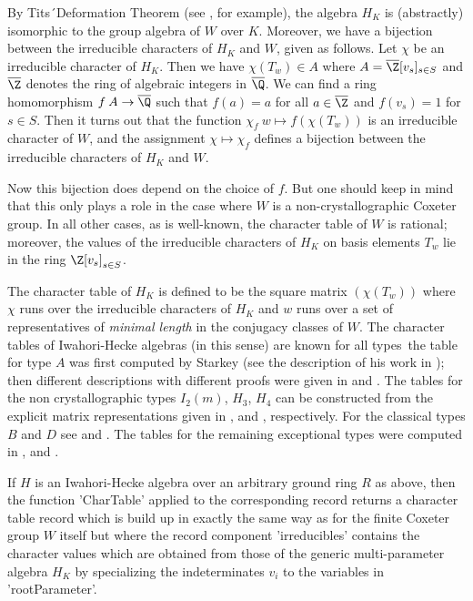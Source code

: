 By Tits\'\ Deformation Theorem (see \cite[Sec.~68]{CR87}, for example), the
algebra  $H_K$ is (abstractly) isomorphic to  the group algebra of $W$ over
$K$.  Moreover, we have  a bijection between  the irreducible characters of
$H_K$  and $W$, given as follows. Let $\chi$ be an irreducible character of
$H_K$. Then we have $\chi(T_w) \in A$ where $A=\overline{\Z}[v_s]_{s\in S}$
and   $\overline{\Z}$   denotes   the   ring   of   algebraic  integers  in
$\overline{\Q}$.  We  can  find  a  ring  homomorphism  $f\:  A \rightarrow
\overline{\Q}$  such  that  $f(a)=a$  for  all  $a  \in  \overline{\Z}$ and
$f(v_s)=1$  for $s\in S$. Then it turns  out that the function $\chi_f \: w
\mapsto   f(\chi(T_w))$  is  an  irreducible  character  of  $W$,  and  the
assignment   $\chi  \mapsto   \chi_f$  defines   a  bijection  between  the
irreducible characters of $H_K$ and $W$.

Now this bijection does depend on the choice of $f$. But one should keep in
mind that this only plays a role in the case where $W$ is a
non-crystallographic  Coxeter group. In all  other cases, as is well-known,
the  character  table  of  $W$  is  rational;  moreover,  the values of the
irreducible  characters of  $H_K$ on  basis elements  $T_w$ lie in the ring
$\Z[v_s]_{s\in S}$.

The  character  table of $H_K$   is   defined to  be  the square   matrix
$(\chi(T_w))$ where $\chi$ runs  over the irreducible characters of $H_K$
and $w$ runs over a set of representatives of {\em minimal length} in the
conjugacy classes of $W$.  The character tables of Iwahori-Hecke algebras
(in this sense) are known  for all types\:\  the  table for type $A$  was
first  computed   by Starkey (see    the   description of   his work   in
\cite{Car86});  then different   descriptions with  different proofs were
given  in  \cite{Ram91} and   \cite{Pfe94b}.    The tables for  the   non
crystallographic types $I_2(m)$, $H_3$, $H_4$ can be constructed from the
explicit   matrix    representations    given   in \cite[Sec.~67C]{CR87},
\cite{Lus81} and \cite{AL82}, respectively.  For  the classical types $B$
and  $D$ see \cite{HR94} and  \cite{Pfe96}.  The tables for the remaining
exceptional  types   were  computed  in  \cite{Gec94},  \cite{Gec95}  and
\cite{GM97}.

If $H$  is an Iwahori-Hecke algebra over  an arbitrary ground ring $R$ as
above, then the {\GAP}  function 'CharTable' applied to the corresponding
record returns a character table record which  is build up in exactly the
same way as for the finite Coxeter group  $W$ itself but where the record
component 'irreducibles' contains the character values which are obtained
from  those of the generic multi-parameter  algebra $H_K$ by specializing
the indeterminates $v_i$ to the variables in 'rootParameter'.

